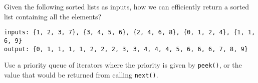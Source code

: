 \question Given the following sorted lists as inputs, how we can efficiently return a sorted list containing all the elements?

\begin{lstlisting}
inputs: {1, 2, 3, 7}, {3, 4, 5, 6}, {2, 4, 6, 8}, {0, 1, 2, 4}, {1, 1, 6, 9}
output: {0, 1, 1, 1, 1, 2, 2, 2, 3, 3, 4, 4, 4, 5, 6, 6, 6, 7, 8, 9}
\end{lstlisting}

\begin{solution}[1in]
Use a priority queue of iterators where the priority is given by \texttt{peek()}, or the value that would be returned from calling \texttt{next()}.
\end{solution}
